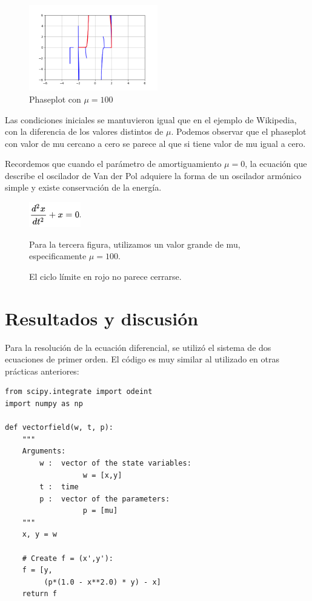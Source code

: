 \documentclass[a4paper]{article}
\begin{document}
\begin{figure}[ht!]
\centering
\centering
\includegraphics[width = 0.5\textwidth]{Figxploremu_100.png}
\caption{Phaseplot con $\mu=100$}
\end{figure}


Las condiciones iniciales se mantuvieron igual que en el ejemplo de Wikipedia, con la diferencia de los valores distintos de $\mu$. 
Podemos observar que el phaseplot con valor de mu cercano a cero se parece al que si tiene valor de mu igual a cero.

Recordemos que cuando el parámetro de amortiguamiento $\mu=0$, la ecuación que describe el oscilador de Van der Pol adquiere la forma de un oscilador armónico simple y existe conservación de la energía.
\newpage

\begin{figure}[ht!]
\centering
\centering
\includegraphics[width = 0.2\textwidth]{Eq_dif4.PNG}


Para la tercera figura, utilizamos un valor grande de mu, especificamente $\mu=100$.

El ciclo límite en rojo no parece cerrarse.

\end{figure}

\section{Resultados y discusión}
Para la resolución de la ecuación diferencial, se utilizó el sistema de dos ecuaciones de primer orden. El código es muy similar al utilizado en otras prácticas anteriores:

\begin{verbatim}
from scipy.integrate import odeint
import numpy as np

def vectorfield(w, t, p):
    """
    Arguments:
        w :  vector of the state variables:
                  w = [x,y]
        t :  time
        p :  vector of the parameters:
                  p = [mu]
    """
    x, y = w

    # Create f = (x',y'):
    f = [y,
         (p*(1.0 - x**2.0) * y) - x]
    return f
\end{verbatim}
\end{document}
